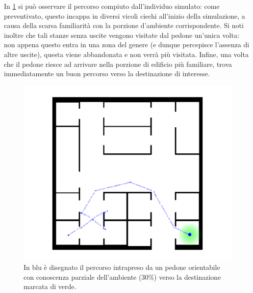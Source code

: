 \documentclass[12pt,a4paper,openright,oneside]{book}
\begin{document}
In \cref{fig:partial-knowledge} si può osservare il percorso compiuto dall'individuo simulato: come preventivato, questo incappa in diversi vicoli ciechi all'inizio della simulazione, a causa della scarsa familiarità con la porzione d'ambiente corrispondente. Si noti inoltre che tali stanze senza uscite vengono visitate dal pedone un'unica volta: non appena questo entra in una zona del genere (e dunque percepisce l'assenza di altre uscite), questa viene abbandonata e non verrà più visitata. Infine, una volta che il pedone riesce ad arrivare nella porzione di edificio più familiare, trova immediatamente un buon percorso verso la destinazione di interesse.  
\begin{figure}
	\centering
	\includegraphics[width=0.7\linewidth]{figures/partial-knowledge.png}
	\caption{In blu è disegnato il percorso intrapreso da un pedone orientabile con conoscenza parziale dell'ambiente (30\%) verso la destinazione marcata di verde.}
	\label{fig:partial-knowledge}
\end{figure}
\end{document}
